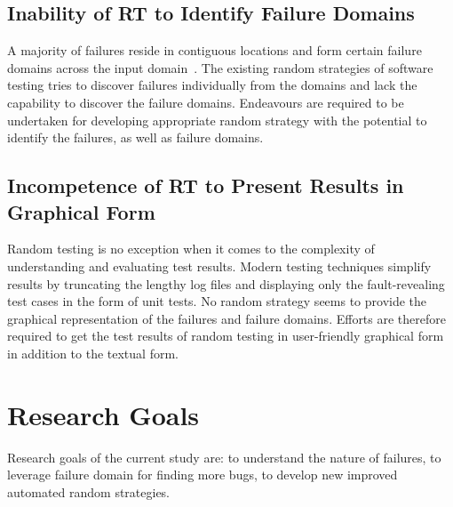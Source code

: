 \subsection{Inability of RT to Identify Failure Domains}
A majority of failures reside in contiguous locations and form certain failure domains across the input domain~\cite{chan1996proportional}. The existing random strategies of software testing tries to discover failures individually from the domains and lack the capability to discover the failure domains. Endeavours are required to be undertaken for developing appropriate random strategy with the potential to identify the failures, as well as failure domains. 


\subsection{Incompetence of RT to Present Results in Graphical Form}
Random testing is no exception when it comes to the complexity of understanding and evaluating test results. Modern testing techniques simplify results by truncating the lengthy log files and displaying only the fault-revealing test cases in the form of unit tests. No random strategy seems to provide the graphical representation of the failures and failure domains. Efforts are therefore required to get the test results of random testing in user-friendly graphical form in addition to the textual form. 






\section{Research Goals}\label{ResearchGoals_1}
Research goals of the current study are: to understand the nature of failures, to leverage failure domain for finding more bugs, to develop new improved automated random strategies.

